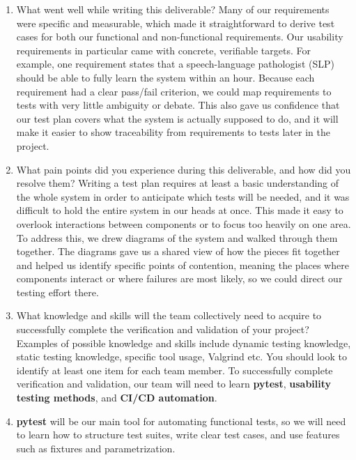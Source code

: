 \documentclass[12pt, titlepage]{article}
\begin{document}
\begin{enumerate}
  \item What went well while writing this deliverable? \newline
  Many of our requirements were specific and measurable, which made it straightforward to derive test cases for both our functional and non-functional requirements.
  Our usability requirements in particular came with concrete, verifiable targets.
  For example, one requirement states that a speech-language pathologist (SLP) should be able to fully learn the system within an hour. Because each requirement had a clear pass/fail criterion, we could map requirements to tests with very little ambiguity or debate. This also gave us confidence that our test plan covers what the system is actually supposed to do, and it will make it easier to show traceability from requirements to tests later in the project.
  \item What pain points did you experience during this deliverable, and how
    did you resolve them? \newline
    Writing a test plan requires at least a basic understanding of the whole system in order to anticipate which tests will be needed, and it was difficult to hold the entire system in our heads at once.
    This made it easy to overlook interactions between components or to focus too heavily on one area. To address this, we drew diagrams of the system and walked through them together.
    The diagrams gave us a shared view of how the pieces fit together and helped us identify specific points of contention, meaning the places where components interact or where failures are most likely, so we could direct our testing effort there.
  \item What knowledge and skills will the team collectively need to acquire to
  successfully complete the verification and validation of your project?
  Examples of possible knowledge and skills include dynamic testing knowledge,
  static testing knowledge, specific tool usage, Valgrind etc.  You should look to
  identify at least one item for each team member. \newline
  To successfully complete verification and validation, our team will need to learn \textbf{pytest}, \textbf{usability testing methods}, and \textbf{CI/CD automation}.
    \item \textbf{pytest} will be our main tool for automating functional tests, so we will need to learn how to structure test suites, write clear test cases, and use features such as fixtures and parametrization.

\end{enumerate}
\end{document}
